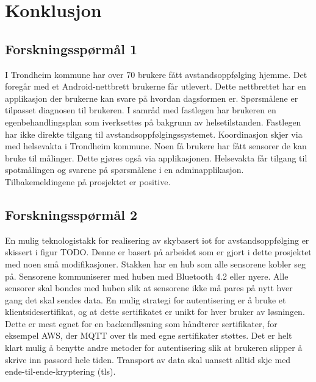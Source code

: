 \chapter{Konklusjon}
\label{ch:conclusion}

\section{Forskningsspørmål 1}
\textbf{}

I Trondheim kommune har over 70 brukere fått avstandsoppfølging hjemme. Det
foregår med et Android-nettbrett brukerne får utlevert. Dette nettbrettet har en
applikasjon der brukerne kan svare på hvordan dagsformen er. Spørsmålene er
tilpasset diagnosen til brukeren. I samråd med fastlegen har brukeren en
egenbehandlingsplan som iverksettes på bakgrunn av helsetilstanden. Fastlegen
har ikke direkte tilgang til avstandsoppfølgingssystemet. Koordinasjon skjer via med
helsevakta i Trondheim kommune. Noen få brukere har fått sensorer de kan bruke
til målinger. Dette gjøres også via applikasjonen. Helsevakta får tilgang til
spotmålingen og svarene på spørsmålene i en adminapplikasjon. Tilbakemeldingene
på prosjektet er positive.


\section{Forskningsspørmål 2}
\textbf{}

En mulig teknologistakk for realisering av skybasert \gls{iot} for
avstandsoppfølging er skissert i figur TODO. Denne er basert på arbeidet som er
gjort i dette prosjektet med noen små modifikasjoner. Stakken har en hub som
alle sensorene kobler seg på. Sensorene kommuniserer med huben med Bluetooth 4.2
eller nyere. Alle sensorer skal bondes med huben slik at sensorene ikke må pares
på nytt hver gang det skal sendes data. En mulig strategi for autentisering er å
bruke et klientsidesertifikat, og at dette sertifikatet er unikt for hver bruker
av løsningen. Dette er mest egnet for en backendløsning som håndterer
sertifikater, for eksempel AWS, der MQTT over \gls{tls} med egne sertifikater
støttes. Det er helt klart mulig å benytte andre metoder for autentisering slik
at brukeren slipper å skrive inn passord hele tiden. Transport av data skal
uansett alltid skje med ende-til-ende-kryptering (\gls{tls}).

